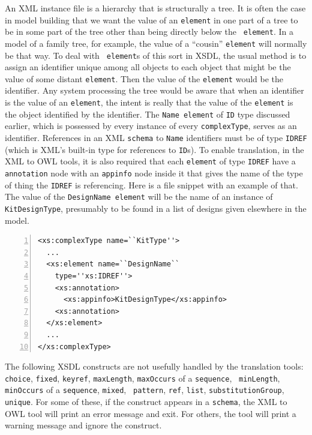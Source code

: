 \documentclass[preprint,12pt]{elsarticle}
\newenvironment{mylisting}
{\begin{list}{}{\setlength{\leftmargin}{1em}}\item\small}
{\end{list}}
\begin{document}
\begin{description}
\item [Specialized Use of ID and IDREF ] An XML instance file is a
  hierarchy that is structurally a tree. It is often the case in model
  building that we want the value of an {\tt element} in one part of a tree
  to be in some part of the tree other than being directly below the {\tt
    element}. In a model of a family tree, for example, the value of a
  “cousin” {\tt element} will normally be that way. To deal with {\tt
    element}s of this sort in XSDL, the usual method is to assign an
  identifier unique among all objects to each object that might be the
  value of some distant {\tt element}. Then the value of the {\tt element}
  would be the identifier. Any system processing the tree would be aware
  that when an identifier is the value of an {\tt element}, the intent is
  really that the value of the {\tt element} is the object identified by
  the identifier. The {\tt Name element} of {\tt ID} type discussed
  earlier, which is possessed by every instance of every {\tt complexType},
  serves as an identifier. References in an XML {\tt schema} to {\tt Name}
  identifiers must be of type {\tt IDREF} (which is XML's built-in type for
  references to {\tt ID}s). To enable translation, in the XML to OWL tools,
  it is also required that each {\tt element} of type {\tt IDREF} have a
  {\tt annotation} node with an {\tt appinfo} node inside it that gives the
  name of the type of thing the {\tt IDREF} is referencing. Here is a file
  snippet with an example of that. The value of the {\tt DesignName
    element} will be the name of an instance of {\tt KitDesignType},
  presumably to be found in a list of designs given elsewhere in the model.



\begin{mylisting}
\begin{Verbatim}[commandchars=\\\{\},numbers=left, numbersep=1pt]
<xs:complexType name=``KitType''>
  ...
  <xs:element name=``DesignName``
    type=''xs:IDREF''>
    <xs:annotation>
      <xs:appinfo>KitDesignType</xs:appinfo>
    <xs:annotation>
  </xs:element>
  ...
</xs:complexType>
\end{Verbatim}
\label{test2}
\end{mylisting}

\item [Other items not handled] The following XSDL constructs are not
  usefully handled by the translation tools: {\tt choice}, {\tt fixed},
  {\tt keyref}, {\tt maxLength}, {\tt maxOccurs} of a {\tt sequence}, {\tt
    minLength}, {\tt minOccurs} of a {\tt sequence}, {\tt mixed}, {\tt
    pattern}, {\tt ref}, {\tt list}, {\tt substitutionGroup}, {\tt unique}.
  For some of these, if the construct appears in a {\tt schema}, the XML to
  OWL tool will print an error message and exit. For others, the tool will
  print a warning message and ignore the construct.
\end{description}
\end{document}
